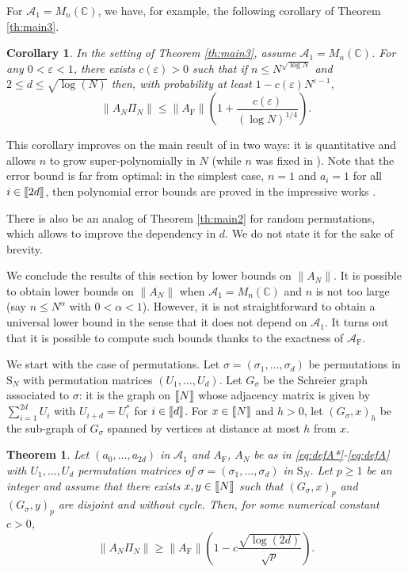 \documentclass[11pt]{article}
\renewcommand{\star}{{\mathrm{F}}}
\newtheorem{theorem}[lemma]{Theorem}
\newtheorem{corollary}[lemma]{Corollary}
\newcommand{\cA}{\mathcal{A}}
\newcommand{\dS}{\mathrm{S}}
\newcommand{\dC}{\mathbb {C}}
\newcommand{\PAR}[1]{{{\left(#1\right)}}} %
\newcommand{\1}{1\!\!{\sf I}}
\newcommand{\veps}{\varepsilon}
\newcommand{\INT}[1]{{{\left[\hspace{-1.4pt}\left[#1\right]\hspace{-1.4pt}\right]}}}
\begin{document}
For $\cA_1 = M_n(\dC)$, we have, for example, the following corollary of Theorem \ref{th:main3}.
\begin{corollary}\label{cor:main3}
In the setting of Theorem \ref{th:main3}, assume $\cA_1 = M_n(\dC)$. For any $0 < \veps < 1$, there exists $c(\veps) >0$ such that if  $n  \leq N^{\sqrt{ \log N}}$ and $2 \leq d \leq \sqrt{\log ( N)}$ then,  with probability at least $1 - c(\veps) N^{\veps -1}$, 
$$
 \| A_N \Pi_N \| \leq \| A_\star \| \PAR{ 1 +  \frac{c(\veps)}{(\log N)^{1/4}}}.
$$
\end{corollary}

This corollary improves on the main result of \cite{MR4024563} in two ways: it is quantitative and allows $n$ to grow super-polynomially in $N$ (while $n$ was fixed in \cite{MR4024563}). Note that the error bound is far from optimal: in the simplest case, $n=1$ and $a_i = 1$ for all $i \in \INT{2d}$, then polynomial error bounds are proved in the impressive works \cite{MR4135670,HuangYau}. 

There is also be an analog of Theorem \ref{th:main2} for random permutations, which allows to improve the dependency in $d$. We do not state it for the sake of brevity. 

We conclude the results of this section by lower bounds on $\|A_N\|$. It is possible to obtain lower bounds on $\| A_N \|$ when $\cA_1 = M_n(\dC)$ and $n$ is not too large (say $n \leq N^{\alpha}$ with $0 < \alpha <1$). However, it is not straightforward to obtain a universal lower bound in the sense that it does not depend on $\cA_1$. It turns out that it is possible to compute such bounds thanks to the exactness of $\cA_\star$.

 We start with the case of permutations. Let $\sigma = (\sigma_1,\ldots, \sigma_d)$ be permutations in $\dS_N$ with permutation matrices $(U_1,\ldots, U_d)$. Let $G_\sigma$ be the Schreier graph associated to $\sigma$: it is  the graph on $\INT{N}$ whose adjacency matrix is given by $\sum_{i=1}^{2d} U_i$ with $U_{i+d} = U_i^*$ for $i\in \INT{d}$. For $x \in \INT{N}$ and $h>0$, let $(G_\sigma ,x)_h$ be the sub-graph of $G_\sigma$ spanned by vertices at distance at most $h$ from $x$. 

\begin{theorem}\label{th:LBP}
Let $(a_0,\ldots,a_{2d})$ in $\cA_1$ and $A_\star$, $A_N$ be as in \eqref{eq:defA*}-\eqref{eq:defA} with  $U_1,\ldots, U_d$ permutation matrices of $\sigma = (\sigma_1,\ldots, \sigma_d)$ in $\dS_N$. Let $p \geq 1$ be an integer and assume that there exists $x,y \in \INT{N}$ such that  $(G_\sigma,x)_p$ and $(G_\sigma,y)_p$ are disjoint and without cycle. Then, for some numerical constant $c >0$,
$$
\| A_N \Pi_N \| \geq \| A_\star \| \PAR{ 1- c \frac{ \sqrt{ \log (2d)}}{\sqrt p}    }.
$$
\end{theorem}
\end{document}
